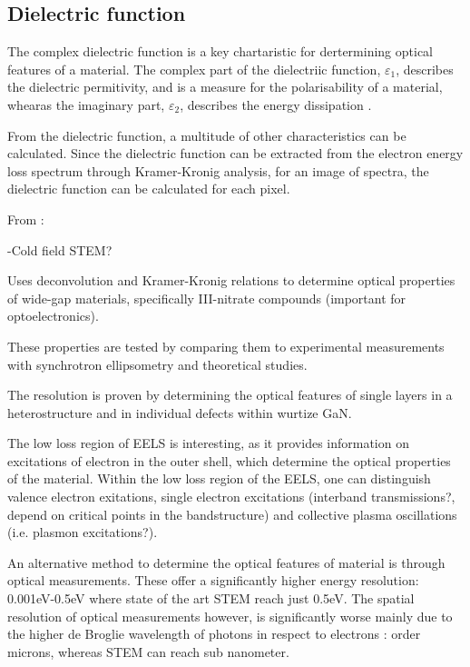 \subsection{Dielectric function}

The complex dielectric function is a key chartaristic for dertermining optical features of a material. The complex part of the dielectriic function, $\varepsilon_1$, describes the dielectric permitivity, and is a measure for the polarisability of a material, whearas the imaginary part, $\varepsilon_2$, describes the energy dissipation \cite{potapov}.


From the dielectric function, a multitude of other characteristics can be calculated. Since the dielectric function can be extracted from the electron energy loss spectrum through Kramer-Kronig analysis, for an image of spectra, the dielectric function can be calculated for each pixel. \cite{egerton_book}



From \cite{brockt_lakner_2000}:

-Cold field STEM?


Uses deconvolution and Kramer-Kronig relations to determine optical properties of wide-gap materials, specifically III-nitrate compounds (important for optoelectronics).

These properties are tested by comparing them to experimental measurements with synchrotron ellipsometry and theoretical studies.

The resolution is proven by determining the optical features of single layers in a heterostructure and in individual defects within wurtize GaN.


The low loss region of EELS is interesting, as it provides information on excitations of electron in the outer shell, which determine the optical properties of the material. Within the low loss region of the EELS, one can distinguish valence electron exitations, single electron excitations (interband transmissions?, depend on critical points in the bandstructure) and collective plasma oscillations (i.e. plasmon excitations?). 

An alternative method to determine the optical features of material is through optical measurements. These offer a significantly higher energy resolution: 0.001eV-0.5eV where state of the art STEM reach just 0.5eV. The spatial resolution of optical measurements however, is significantly worse mainly due to the higher de Broglie wavelength of photons in respect to electrons \cite{iets}: order microns, whereas STEM can reach sub nanometer.


